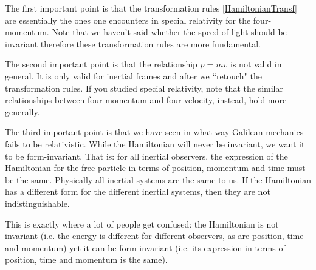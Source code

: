 \documentclass[aps,pra,10pt,floatfix,nofootinbib]{revtex4-1}
\theoremstyle{definition}
\begin{document}
The first important point is that the transformation rules \eqref{HamiltonianTransf} are essentially the ones one encounters in special relativity for the four-momentum. Note that we haven't said whether the speed of light should be invariant therefore these transformation rules are more fundamental.

The second important point is that the relationship $p=mv$ is not valid in general. It is only valid for inertial frames and after we ``retouch" the transformation rules. If you studied special relativity, note that the similar relationships between four-momentum and four-velocity, instead, hold more generally.

The third important point is that we have seen in what way Galilean mechanics fails to be relativistic. While the Hamiltonian will never be invariant, we want it to be form-invariant. That is: for all inertial observers, the expression of the Hamiltonian for the free particle in terms of position, momentum and time must be the same. Physically all inertial systems are the same to us. If the Hamiltonian has a different form for the different inertial systems, then they are not indistinguishable.

This is exactly where a lot of people get confused: the Hamiltonian is not invariant (i.e. the energy is different for different observers, as are position, time and momentum) yet it can be form-invariant (i.e. its expression in terms of position, time and momentum is the same).
\end{document}
